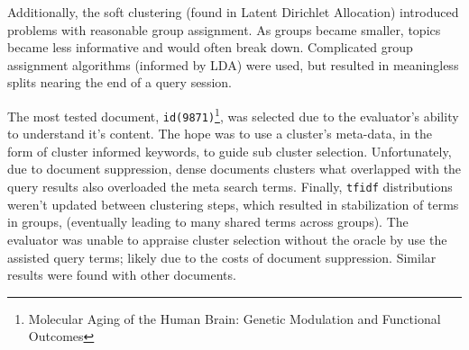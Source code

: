 \documentclass[11pt]{article}
\def\tfidf{\texttt{tfidf}\xspace}
\begin{document}
Additionally, the soft clustering (found in Latent Dirichlet Allocation) introduced
problems with reasonable group assignment. As groups became smaller, topics became
less informative and would often break down. Complicated group assignment algorithms
(informed by LDA) were used, but resulted in meaningless splits nearing the end
of a query session.

The most tested document,
\texttt{id(9871)}\footnote{Molecular Aging of the Human Brain: Genetic Modulation and Functional Outcomes},
was selected due to the evaluator's ability to understand it's content. The hope
was to use a cluster's meta-data, in the form of cluster informed keywords, to guide
sub cluster selection. Unfortunately, due to document suppression, dense documents
clusters what overlapped with the query results also overloaded the meta search terms.
Finally, \tfidf distributions weren't updated between clustering steps, which resulted
in stabilization of terms in groups, (eventually leading to many shared terms across
groups). The evaluator was unable to appraise cluster selection without the oracle by
use the assisted query terms; likely due to the costs of document suppression. Similar
results were found with other documents.
\end{document}

